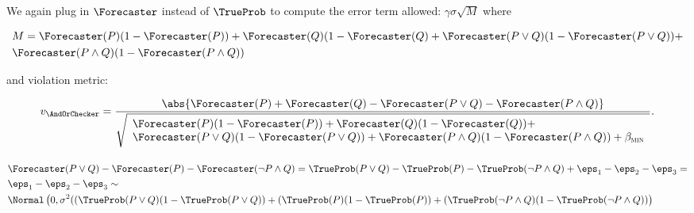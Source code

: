 
We again plug in $\Forecaster$ instead of $\TrueProb$ to compute the error term allowed: $\gamma \sigma \sqrt{M}$ where

\begin{align*}
    &M = \Forecaster(P)(1 - \Forecaster(P)) + \Forecaster(Q)(1 - \Forecaster(Q) + \Forecaster(P \lor Q)(1 - \Forecaster(P \lor Q)) + \\
    &\Forecaster(P \land Q)(1 - \Forecaster(P \land Q))
\end{align*}

and violation metric:

\begin{align*}
    v_{\AndOrChecker}
    = \frac{\abs{\Forecaster(P) + \Forecaster(Q) - \Forecaster(P \lor Q) - \Forecaster(P \land Q)}}{
        \sqrt{\begin{array}{l}
            \Forecaster(P)(1 - \Forecaster(P)) + \Forecaster(Q)(1 - \Forecaster(Q)) + \\
            \Forecaster(P \lor Q)(1 - \Forecaster(P \lor Q)) + \Forecaster(P \land Q)(1 - \Forecaster(P \land Q)) + \betamin
        \end{array}}
    }.
\end{align*}

\paragraph{\ButChecker}

\begin{align*}
   &\Forecaster(P \lor Q) - \Forecaster(P) - \Forecaster(\lnot P \land Q) =
   \TrueProb(P \lor Q) - \TrueProb(P) - \TrueProb(\lnot P \land Q) + \eps_1 - \eps_2 - \eps_3 =\\
   &\eps_1 - \eps_2 - \eps_3 \sim\\
   &\Normal\left(0, \sigma^2 ((\TrueProb(P \lor Q)(1 - \TrueProb(P \lor Q)) + (\TrueProb(P)(1 - \TrueProb(P)) + (\TrueProb(\lnot P \land Q)(1 - \TrueProb(\lnot P \land Q)) \right)
\end{align*}

